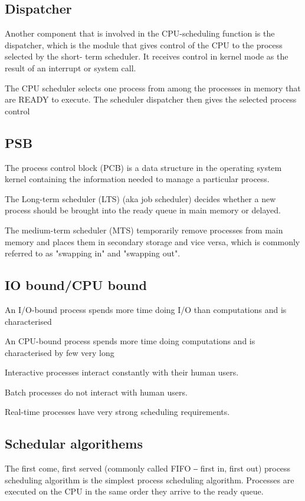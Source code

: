 \subsection{Dispatcher}
Another component that is involved in the
CPU-scheduling function is the dispatcher,
which is the module that gives control of the
CPU to the process selected by the short-
term scheduler. It receives control in kernel
mode as the result of an interrupt or system
call.  \newline

The CPU scheduler selects one process from among the
processes in memory that are READY to execute. The
scheduler dispatcher then gives the selected process control

\subsection{PSB}
The process control block (PCB) is a data
structure in the operating system kernel
containing the information needed to
manage a particular process. \newline

The Long-term scheduler (LTS) (aka job
scheduler) decides whether a new process should
be brought into the ready queue in main memory
or delayed. \newline

The medium-term scheduler (MTS) temporarily remove processes from
main memory and places them in secondary storage and vice versa,
which is commonly referred to as "swapping in" and "swapping out".

\subsection{IO bound/CPU bound}
An I/O-bound process spends
more time doing I/O than
computations and is characterised \newline

An CPU-bound process spends
more time doing computations and
is characterised by few very long

Interactive processes interact constantly with their human
users.  \newline

Batch processes do not interact with human users. \newline

Real-time processes have very strong scheduling
requirements.

\subsection{Schedular algorithems}
The first come, first served (commonly called FIFO ‒ first
in, first out) process scheduling algorithm is the simplest
process scheduling algorithm. Processes are executed on
the CPU in the same order they arrive to the ready queue. \newline


